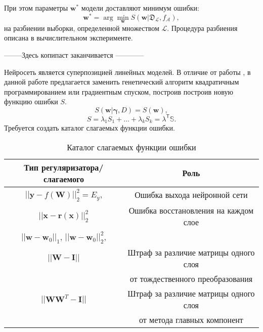 \documentclass[12pt, twoside]{article}
\newcommand{\xb}{{\mathbf{x}}}
\newenvironment{comment}{}{}
\newcommand{\w}{{\mathbf{W}}}
\newcommand{\wm}{{\mathbf{w}}}
\begin{document}
\begin{comment}
При этом параметры $\textbf{w}^*$ модели доставляют минимум ошибки:
\begin{equation}\label{eq102}
\textbf{w}^* = \arg \underset{\textbf{w}}\min S(\textbf{w}|\mathfrak{D}_\mathcal{L}, f_\mathcal{A}),
\end{equation}
на разбиении выборки, определенной множеством $\mathcal{L}$. Процедура разбиения описана в вычислительном эксперименте.



--------Здесь копипаст заканчивается ------------





Нейросеть является суперпозицией линейных моделей. В отличие от работы \cite{bib_4}, в данной работе предлагается заменить генетический алгоритм квадратичным программированием или градиентным спуском, построив построив новую функцию ошибки $S$.
\begin{equation}
S(\wm|\mathbf{\gamma},D) = S(\wm),
\end{equation}
\begin{equation}\label{eq11}
S = \lambda_1S_1+\dots+\lambda_kS_k = \mathbb{\lambda}^{\mathsf{T}}\mathbb{S}.
\end{equation}
Требуется создать каталог слагаемых функции ошибки.
\begin{table}[h!]
\begin{center}
\begin{tabular}{|c|c|}
\hline
  Тип регуляризатора/слагаемого   & Роль  \\
  \hline
  $||\mathbf{y} - f(\w)||^2_2 = E_y$,   & Ошибка выхода нейронной сети \\
  \hline
  $||\xb-\mathbf{r}(\xb)||^2_2$ & Ошибка восстановления на каждом слое \\
  \hline
  $||\wm-\wm_0||_1$, $||\wm-\wm_0||^2_2$, & \\
  \hline
  $||\w-\mathbf{I}||$ & Штраф за различие матрицы одного слоя \\
  & от тождественного преобразования \\
  \hline
  $||\w\w^T-\mathbf{I}||$ & Штраф за различие матрицы одного слоя \\
  & от метода главных компонент \\
  \hline
\end{tabular}
\caption{Каталог слагаемых функции ошибки}
\end{center}
\end{table}



\end{comment}
\end{document}
